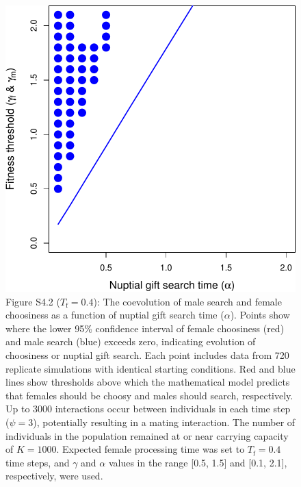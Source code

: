 \documentclass[
]{article}
\begin{document}
\captionsetup{labelformat=default}

\clearpage

\captionsetup{labelformat=empty}

\begin{figure}
\centering
\includegraphics{ms_refs_fixed_files/figure-latex/unnamed-chunk-7-1.pdf}
\caption{Figure S4.2 (\(T_{\mathrm{f}} = 0.4\)): The coevolution of male
search and female choosiness as a function of nuptial gift search time
(\(\alpha\)). Points show where the lower 95\% confidence interval of
female choosiness (red) and male search (blue) exceeds zero, indicating
evolution of choosiness or nuptial gift search. Each point includes data
from 720 replicate simulations with identical starting conditions. Red
and blue lines show thresholds above which the mathematical model
predicts that females should be choosy and males should search,
respectively. Up to 3000 interactions occur between individuals in each
time step (\(\psi = 3\)), potentially resulting in a mating interaction.
The number of individuals in the population remained at or near carrying
capacity of \(K = 1000\). Expected female processing time was set to
\(T_{\mathrm{f}}=0.4\) time steps, and \(\gamma\) and \(\alpha\) values
in the range {[}0.5, 1.5{]} and {[}0.1, 2.1{]}, respectively, were
used.}
\end{figure}
\end{document}
